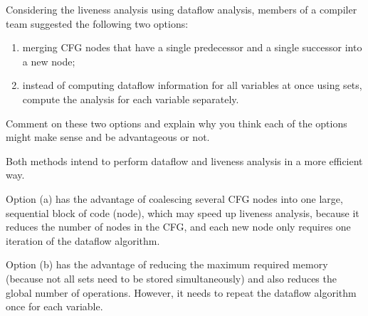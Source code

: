 \documentclass[docid=2019]{comp_exam_round2}
\begin{document}
\examgroup{}

\question
Considering the liveness analysis using dataflow analysis, members of a compiler team suggested the following two options:

\begin{enumerate}[label=(\alph*)]
    \item merging CFG nodes that have a single predecessor and a single successor into a new node;
    \item instead of computing dataflow information for all variables at once using sets, compute the analysis for each variable separately.
\end{enumerate}

Comment on these two options and explain why you think each of the options might make sense and be advantageous or not.

\ansseparator

\noindent
Both methods intend to perform dataflow and liveness analysis in a more efficient way.

Option (a) has the advantage of coalescing several CFG nodes into one large, sequential block of code (node), which may speed up liveness analysis, because it reduces the number of nodes in the CFG, and each new node only requires one iteration of the dataflow algorithm.

Option (b) has the advantage of reducing the maximum required memory (because not all sets need to be stored simultaneously) and also reduces the global number of operations. However, it needs to repeat the dataflow algorithm once for each variable.
\end{document}
